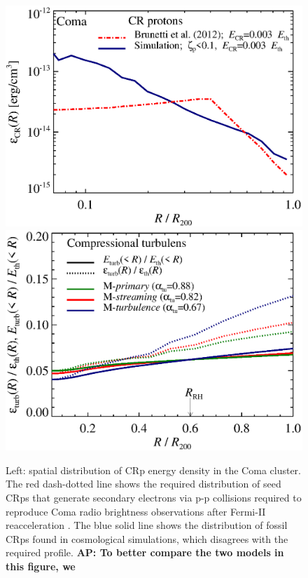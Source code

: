 \documentclass[a4paper,fleqn,usenatbib]{mnras}
\def\AP#1{{\bf  AP: #1}}
\begin{document}
\begin{figure}
  \includegraphics[width=1.0\columnwidth]{fCR.radius.coma.g72a.Rad14.2400p.z0.NL.xKR.eb23.eI067.DII.140.v6.eps}
  \includegraphics[width=1.0\columnwidth]{turb_profile_ratio_tot.eps}
  \caption{Left: spatial distribution of CRp energy density in the
    Coma cluster. The red dash-dotted line shows the required
    distribution of seed CRps that generate secondary electrons via
    p-p collisions required to reproduce Coma radio brightness
    observations after Fermi-II reacceleration \citep{brunetti12}. The
    blue solid line shows the distribution of fossil CRps found in
    cosmological simulations, which disagrees with the required
    profile. \AP{To better compare the two models in this figure, we
}}
\end{figure}
\end{document}
